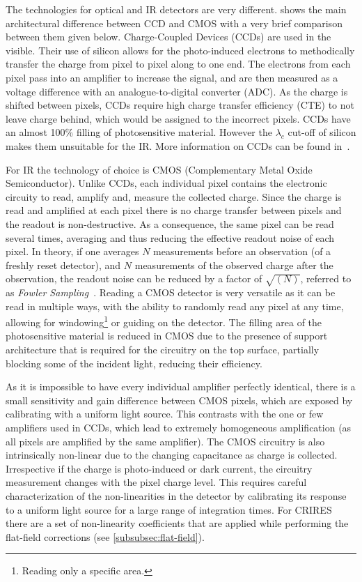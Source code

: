 The technologies for optical and {IR} detectors are very different.
 shows the main architectural difference between {CCD} and {CMOS} with a very brief comparison between them given below.
Charge-Coupled Devices ({CCDs}) are used in the visible.
Their use of silicon allows for the photo-induced electrons to methodically transfer the charge from pixel to pixel along to one end.
The electrons from each pixel pass into an amplifier to increase the signal, and are then measured as a voltage difference with an analogue-to-digital converter (ADC).
As the charge is shifted between pixels, {CCDs} require high charge transfer efficiency (CTE) to not leave charge behind, which would be assigned to the incorrect pixels.
{CCDs} have an almost 100\% filling of photosensitive material.
However the \({\lambda}_{c}\) cut-off of silicon makes them unsuitable for the {IR}.
More information on {CCDs} can be found in~\citet{howell_handbook_2000}.

For {IR} the technology of choice is {CMOS} (Complementary Metal Oxide Semiconductor).
Unlike {CCDs}, each individual pixel contains the electronic circuity to read, amplify and, measure the collected charge.
Since the charge is read and amplified at each pixel there is no charge transfer between pixels and the readout is non-destructive.
As a consequence, the same pixel can be read several times, averaging and thus reducing the effective readout noise of each pixel.
In theory, if one averages \(N\) measurements before an observation (of a freshly reset detector), and \(N\) measurements of the observed charge after the observation, the readout noise can be reduced by a factor of \(\sqrt{(N)}\), referred to as \emph{Fowler Sampling}~\citep{fowler_demonstration_1990}.
Reading a {CMOS} detector is very versatile as it can be read in multiple ways, with the ability to randomly read any pixel at any time, allowing for windowing\footnote{Reading only a specific area.} or guiding on the detector.
The filling area of the photosensitive material is reduced in {CMOS} due to the presence of support architecture that is required for the circuitry on the top surface, partially blocking some of the incident light, reducing their efficiency.

As it is impossible to have every individual amplifier perfectly identical, there is a small sensitivity and gain difference between {CMOS} pixels, which are exposed by calibrating with a uniform light source.
This contrasts with the one or few amplifiers used in {CCDs}, which lead to extremely homogeneous amplification (as all pixels are amplified by the same amplifier).
The {CMOS} circuitry is also intrinsically non-linear due to the changing capacitance as charge is collected.
Irrespective if the charge is photo-induced or dark current, the circuitry measurement changes with the pixel charge level.
This requires careful characterization of the non-linearities in the detector by calibrating its response to a uniform light source for a large range of integration times.
For {CRIRES} there are a set of non-linearity coefficients that are applied while performing the flat-field corrections (see \cref{subsubsec:flat-field}).

